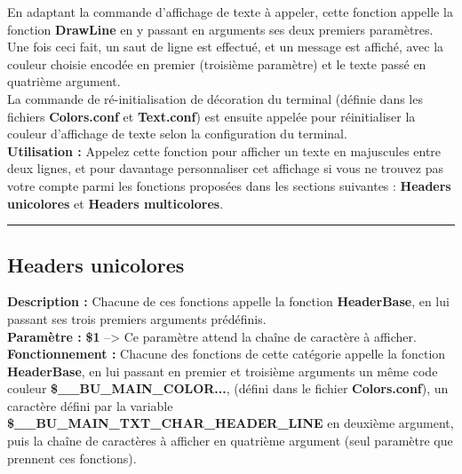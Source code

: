 \documentclass[a4paper,10pt]{article}
\begin{document}
En adaptant la commande d'affichage de texte à appeler, cette fonction appelle la fonction \textbf{\color{mauve}DrawLine\color{white}} en y passant en arguments ses deux premiers paramètres.\\[1\baselineskip]

Une fois ceci fait, un saut de ligne est effectué, et un message est affiché, avec la couleur choisie\linebreak
encodée en premier (troisième paramètre) et le texte passé en quatrième argument.\\[1\baselineskip]

La commande de ré-initialisation de décoration du terminal (définie dans les fichiers \textbf{\color{lime}Colors.conf\color{white}} et \textbf{\color{lime}Text.conf\color{white}}) est ensuite appelée pour réinitialiser la couleur d'affichage de texte selon la configuration du terminal.\\[1\baselineskip]

\textbf{Utilisation :}\linebreak
Appelez cette fonction pour afficher un texte en majuscules entre deux lignes, et pour davantage\linebreak
personnaliser cet affichage si vous ne trouvez pas votre compte parmi les fonctions proposées dans les sections suivantes :
\textbf{\color{green}Headers unicolores\color{white}} et \textbf{\color{green}Headers multicolores\color{white}}.\\[1\baselineskip]


\color{green}\par\noindent\rule{\textwidth}{0.4pt}\color{white}

\color{green}
\subsection{Headers unicolores}\color{white}
\textbf{Description :}\linebreak
Chacune de ces fonctions appelle la fonction \textbf{\color{mauve}HeaderBase\color{white}}, en lui passant ses trois premiers\linebreak
arguments prédéfinis.\\[1\baselineskip]

\textbf{Paramètre :}\linebreak
\textbf{\color{orange}\$1\color{white}} --> Ce paramètre attend la chaîne de caractère à afficher.\\[1\baselineskip]


\textbf{Fonctionnement :}\linebreak
Chacune des fonctions de cette catégorie appelle la fonction \textbf{\color{mauve}HeaderBase\color{white}}, en lui passant en premier et troisième arguments un même code couleur \textbf{\color{orange}\$\_\_BU\_MAIN\_COLOR...\color{white}}, (défini dans le fichier \textbf{\color{lime}Colors.conf\color{white}}), un caractère défini par la variable \textbf{\color{orange}\$\_\_BU\_MAIN\_TXT\_CHAR\_HEADER\_LINE\color{white}} en deuxième\linebreak
argument, puis la chaîne de caractères à afficher en quatrième argument (seul paramètre que prennent ces fonctions).\\[1\baselineskip]
\end{document}
